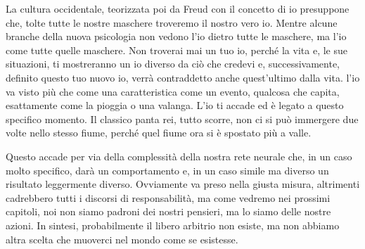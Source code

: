 \documentclass[12pt]{book} %
\begin{document}
La cultura occidentale, teorizzata poi da Freud con il concetto di {\textquotedbl}io{\textquotedbl} presuppone che,
tolte tutte le nostre maschere troveremo il nostro vero io. Mentre alcune branche della nuova psicologia non vedono
l'io dietro tutte le maschere, ma l'io come tutte quelle maschere. Non troverai mai un tuo io, perché la vita e, le sue
situazioni, ti mostreranno un io diverso da ciò che credevi e, successivamente, definito questo tuo nuovo io, verrà
contraddetto anche quest'ultimo dalla vita. l'io va visto più che come una caratteristica come un
evento, qualcosa che capita, esattamente come la pioggia o una valanga. L'io ti accade ed è legato a questo specifico
momento. Il classico panta rei, tutto scorre, non ci si può immergere due volte nello stesso fiume, perché quel fiume
ora si è spostato più a valle.

Questo accade per via della complessità della nostra rete neurale che, in un caso molto specifico, darà un comportamento
e, in un caso simile ma diverso un risultato leggermente diverso. Ovviamente va preso nella giusta misura, altrimenti
cadrebbero tutti i discorsi di responsabilità, ma come vedremo nei prossimi capitoli, noi non siamo padroni dei nostri
pensieri, ma lo siamo delle nostre azioni. In sintesi, probabilmente il libero arbitrio non esiste, ma non abbiamo
altra scelta che muoverci nel mondo come se esistesse.
\end{document}
